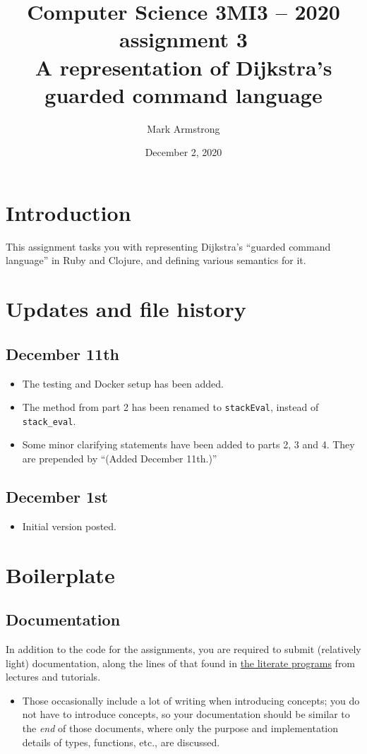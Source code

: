 \documentclass[11pt]{article}
\author{Mark Armstrong}
\date{December 2, 2020}
\title{Computer Science 3MI3 – 2020 assignment 3\\\medskip
\large A representation of Dijkstra's guarded command language}
\theoremstyle{definition}
\begin{document}
\maketitle
\tableofcontents


\section*{Introduction}
\label{sec:org82aef75}
This assignment tasks you with representing
Dijkstra's “guarded command language” in
Ruby and Clojure,
and defining various semantics for it.

\section*{Updates and file history}
\label{sec:org9e8981e}
\subsection*{December 11th}
\label{sec:org2952484}
\begin{itemize}
\item The testing and Docker setup has been added.
\item The method from part 2 has been renamed to \texttt{stackEval},
instead of \texttt{stack\_eval}.
\item Some minor clarifying statements have been added to parts 2, 3 and 4.
They are prepended by “(Added December 11th.)”
\end{itemize}

\subsection*{December 1st}
\label{sec:orgc61087c}
\begin{itemize}
\item Initial version posted.
\end{itemize}

\section*{Boilerplate}
\label{sec:orge8499f1}
\subsection*{Documentation}
\label{sec:orgb955d3f}
In addition to the code for the assignments,
you are required to submit (relatively light) documentation,
along the lines of that found in
\href{https://armkeh.github.io/principles-of-programming-languages/\#outline-container-Lecture-literate-programs}{the literate programs}
from lectures and tutorials.
\begin{itemize}
\item Those occasionally include a lot of writing when introducing concepts;
you do not have to introduce concepts, so your documentation
should be similar to the \emph{end} of those documents,
where only the purpose and implementation details
of types, functions, etc., are discussed.
\end{itemize}
\end{document}
